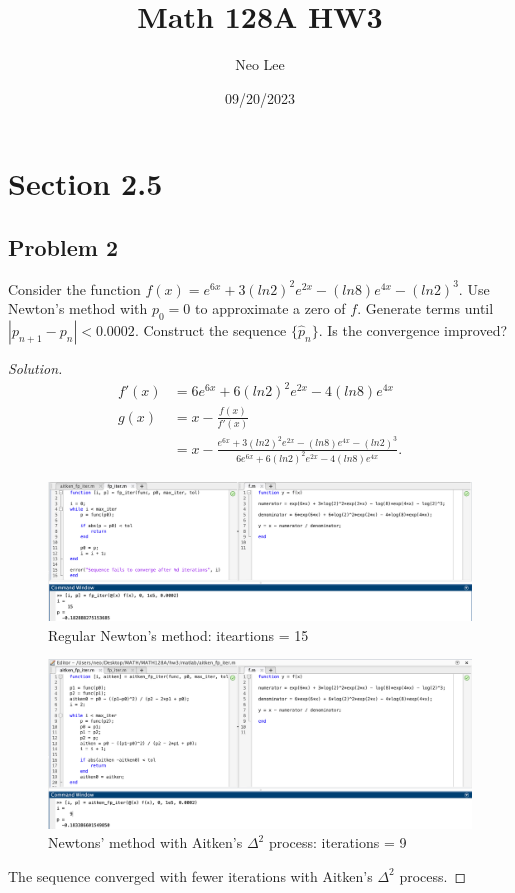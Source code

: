 \documentclass{article}
\title{Math 128A HW3}
\author{Neo Lee}
\date{09/20/2023}
\begin{document}
 

\maketitle 

\section*{Section 2.5}
\subsection*{Problem 2}
Consider the function $f(x)=e^{6x}+3(ln2)^2e^{2x}-(ln8)e^{4x}-(ln2)^3$. Use Newton's method with 
$p_0=0$ to approximate a zero of $f$. Generate terms until $|p_{n+1}-p_n|<0.0002$. Construct the 
sequence $\{\hat{p}_n\}$. Is the convergence improved?
\begin{proof}[Solution]
    \begin{align*}
        f'(x) & = 6e^{6x}+6(ln2)^2e^{2x}-4(ln8)e^{4x} \\
        g(x) & = x-\frac{f(x)}{f'(x)} \\
        & = x-\frac{e^{6x}+3(ln2)^2e^{2x}-(ln8)e^{4x}-(ln2)^3}{6e^{6x}+6(ln2)^2e^{2x}-4(ln8)e^{4x}}.
    \end{align*}
    \begin{figure}[htb!]
        \centering
        \includegraphics[scale=0.2]{2.5.2_1.png}
        \caption{Regular Newton's method: iteartions = 15}
    \end{figure}
    \begin{figure}[htb!]
        \centering
        \includegraphics[scale=0.2]{2.5.2_2.png}
        \caption{Newtons' method with Aitken's $\Delta^2$ process: iterations = 9}
    \end{figure}
    
    The sequence converged with fewer iterations with Aitken's $\Delta^2$ process.
\end{proof}
\end{document}
